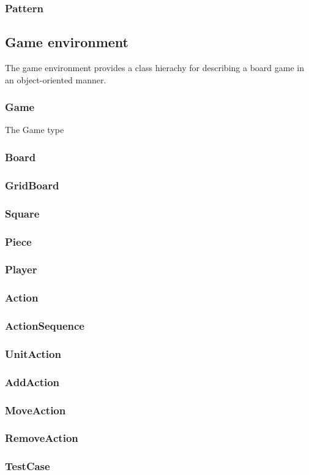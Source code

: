 \subsubsection{Pattern}

\subsection{Game environment}
\label{sec:gameenvironment}

The game environment provides a class hierachy for describing a board game in an object-oriented manner.

\subsubsection{Game}
The Game type 

\subsubsection{Board}

\subsubsection{GridBoard}

\subsubsection{Square}

\subsubsection{Piece}

\subsubsection{Player}

\subsubsection{Action}

\subsubsection{ActionSequence}

\subsubsection{UnitAction}

\subsubsection{AddAction}

\subsubsection{MoveAction}

\subsubsection{RemoveAction}

\subsubsection{TestCase}

